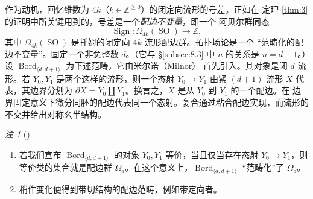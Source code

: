 \documentclass[11pt]{amsart}
\theoremstyle{definition}
\theoremstyle{remark}
\newtheorem{remark}[equation]{注}
\theoremstyle{plain}
\numberwithin{equation}{section}
\renewcommand{\:}{\colon}
\DeclareMathOperator{\Spin}{Spin}
\newcommand{\ZZ}{{\mathbb Z}}
\DeclareMathOperator{\SO}{SO}
\let\O\relax
\DeclareMathOperator{\O}{O}
\let\O\relax\DeclareMathOperator{\O}{O}
\DeclareMathOperator{\Bord}{Bord}
\DeclareMathOperator{\Sign}{Sign}
\newcommand{\Bd}{\Bord_{\langle d,d+1  \rangle}}
\begin{document}

作为动机，回忆维数为 $4k$（$k\in \ZZ^{\ge0}$）的闭定向流形的号差。正如在
定理 \ref{thm:3} 的证明中所关键用到的，号差是一个\emph{配边不变量}，即一个
阿贝尔群同态
  \begin{equation}\label{eq:124}
     \Sign\:\Omega _{4k}(\SO)\longrightarrow \ZZ, 
  \end{equation}
其中 $\Omega _{4k}(\SO)$ 是托姆的闭定向 $4k$ 流形配边群。拓扑场论是一个
“范畴化的配边不变量”。固定一个非负整数 $d$。（它与 §\ref{subsec:8.3} 中
$n$ 的关系是 $n=d+1$。）设 $\Bd$ 为下述范畴，它由米尔诺（Milnor）\cite{Mi2}
首先引入。其对象是闭 $d$ 流形。若 $Y_0,Y_1$ 是两个这样的流形，则一个态射
$Y_0\to Y_1$ 由紧 $(d+1)$ 流形 $X$ 代表，其边界分划为
$\partial X=Y_0\amalg Y_1$。换言之，$X$ 是从 $Y_0$ 到 $Y_1$ 的一个配边。在
边界固定意义下微分同胚的配边代表同一个态射。复合通过粘合配边实现，而流形的
不交并给出对称幺半结构。

   \begin{remark}[]\label{thm:30}
 \ 

 \begin{enumerate}%


 \item 若我们宣布 $\Bd$ 的对象 $Y_0,Y_1$ 等价，当且仅当存在态射
 $Y_0\to Y_1$，则等价类的集合就是配边群 $\Omega _d$。在这个意义上，$\Bd$
 “范畴化”了 $\Omega _d$。


 \item 稍作变化便得到带切结构的配边范畴，例如带定向者。

 \end{enumerate}
   \end{remark}
\end{document}
